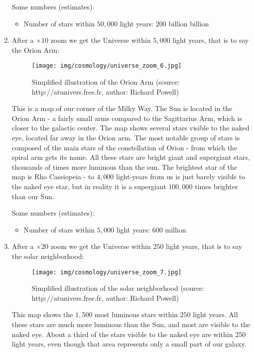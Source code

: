 \begin{enumerate}
		Some numbers (estimates):
		\begin{itemize}
			\item Number of stars within $50,000$ light years: $200$ billion billion
		\end{itemize}
		
		\item After a $\times 10$ zoom we get the Universe within $5,000$ light years, that is to say the Orion Arm:
		\begin{figure}[H]
			\centering
			\texttt{[image: img/cosmology/universe\_zoom\_6.jpg]}
			\caption{Simplified illustration of the Orion Arm (source: http://atunivers.free.fr, author: Richard Powell)}
		\end{figure}
		This is a map of our corner of the Milky Way. The Sun is located in the Orion Arm - a fairly small arms compared to the Sagittarius Arm, which is closer to the galactic center. The map shows several stars visible to the naked eye, located far away in the Orion arm. The most notable group of stars is composed of the main stars of the constellation of Orion - from which the spiral arm gets its name. All these stars are bright giant and supergiant stars, thousands of times more luminous than the sun. The brightest star of the map is Rho Cassiopeia - to $4,000$ light-years from us is just barely visible to the naked eye star, but in reality it is a supergiant $100,000$ times brighter than our Sun.
		
		Some numbers (estimates):
		\begin{itemize}
			\item Number of stars within $5,000$ light years: $600$ million
		\end{itemize}
		
		\item After a $\times 20$ zoom we get the Universe within $250$ light years, that is to say the solar neighborhood:
		\begin{figure}[H]
			\centering
			\texttt{[image: img/cosmology/universe\_zoom\_7.jpg]}
			\caption{Simplified illustration of the solar neighborhood (source: http://atunivers.free.fr, author: Richard Powell)}
		\end{figure}
		This map shows the $1,500$ most luminous stars within $250$ light years. All these stars are much more luminous than the Sun, and most are visible to the naked eye. About a third of the stars visible to the naked eye are within $250$ light years, even though that area represents only a small part of our galaxy.
		

\end{enumerate}
